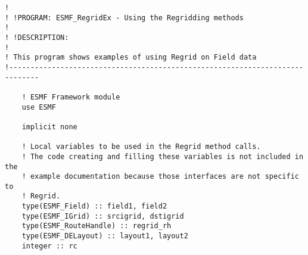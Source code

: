  
\setlength{\oldparskip}{\parskip}
\setlength{\parskip}{1.5ex}
\setlength{\oldparindent}{\parindent}
\setlength{\parindent}{0pt}
\setlength{\oldbaselineskip}{\baselineskip}
\setlength{\baselineskip}{11pt}
 
\def\bv{\begin{verbatim}}
\def\ev{\end{verbatim}}
\def\be{\begin{equation}}
\def\ee{\end{equation}}
\def\bea{\begin{eqnarray}}
\def\eea{\end{eqnarray}}
\def\bi{\begin{itemize}}
\def\ei{\end{itemize}}
\def\bn{\begin{enumerate}}
\def\en{\end{enumerate}}
\def\bd{\begin{description}}
\def\ed{\end{description}}
\def\({\left (}
\def\){\right )}
\def\[{\left [}
\def\]{\right ]}
\def\<{\left  \langle}
\def\>{\right \rangle}
\def\cI{{\cal I}}
\def\diag{\mathop{\rm diag}}
\def\tr{\mathop{\rm tr}}


 

 \begin{verbatim}
!
! !PROGRAM: ESMF_RegridEx - Using the Regridding methods
!
! !DESCRIPTION:
!
! This program shows examples of using Regrid on Field data
!-----------------------------------------------------------------------------

    ! ESMF Framework module
    use ESMF

    implicit none
    
    ! Local variables to be used in the Regrid method calls.
    ! The code creating and filling these variables is not included in the
    ! example documentation because those interfaces are not specific to
    ! Regrid.
    type(ESMF_Field) :: field1, field2
    type(ESMF_IGrid) :: srcigrid, dstigrid
    type(ESMF_RouteHandle) :: regrid_rh
    type(ESMF_DELayout) :: layout1, layout2
    integer :: rc

 
\end{verbatim}
 

